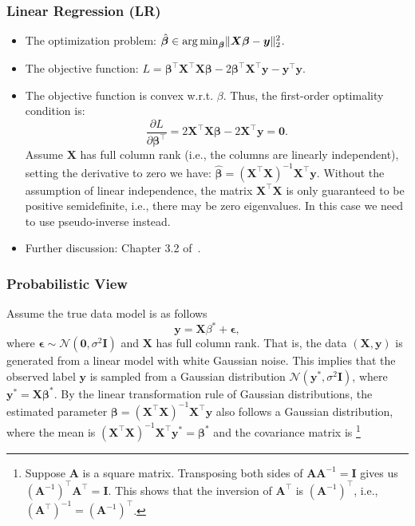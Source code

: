     \subsubsection{Linear Regression (LR)}\label{ML:linear-regression}
        \begin{itemize}
            \item The optimization problem: $\hat{\bm{\beta}} \in \operatorname{arg\,min}_{\bm{\beta}} \lVert\bm{X} \bm{\beta} - \bm{y}\rVert_2^2$.
            \item The objective function: $L = \bm{\beta}^\top \bm{X}^\top \bm{X} \bm{\beta} - 2 \bm{\beta}^\top \bm{X}^\top \bm{y} - \bm{y}^\top \bm{y}$.
            \item The objective function is convex w.r.t. $\beta$. Thus, the first-order optimality condition is: 
                \begin{equation}
                    \frac{\partial L}{\partial \bm{\beta}^\top} =  2 \bm{X}^\top \bm{X} \bm{\beta} - 2\bm{X}^\top \bm{y} = \bm{0}.
                \end{equation}
            Assume $\bm{X}$ has full column rank (i.e., the columns are linearly independent),  setting the derivative to zero we have: $\hat{\bm{\beta}} = (\bm{X}^\top \bm{X})^{-1} \bm{X}^\top \bm{y}$. Without the assumption of linear independence, the matrix $\bm{X}^\top \bm{X}$ is only guaranteed to be positive semidefinite, i.e., there may be zero eigenvalues. 
            In this case we need to use pseudo-inverse instead. 
            \item Further discussion: Chapter 3.2 of~\cite{hastie2009elements}.
        \end{itemize}

    \subsubsection{Probabilistic View}
        Assume the true data model is as follows
            \begin{equation}
                \bm{y} = \bm{X} \beta^\ast + \bm{\epsilon},
            \end{equation}
        where $\bm{\epsilon} \sim \mathcal{N}(\bm{0}, \sigma^2 \bm{I})$ and $\bm{X}$ has full column rank.
        That is, the data $(\bm{X}, \bm{y})$ is generated from a linear model with white Gaussian noise.
        This implies that the observed label $\bm{y}$ is sampled from a Gaussian distribution $\mathcal{N}(\bm{y}^\ast, \sigma^2 \bm{I})$, where $\bm{y}^\ast = \bm{X} \bm{\beta}^\ast$.
        By the linear transformation rule of Gaussian distributions, the estimated parameter $\bm{\beta} = (\bm{X}^\top \bm{X})^{-1} \bm{X}^\top \bm{y}$ also follows a Gaussian distribution, where the mean is $ (\bm{X}^\top \bm{X})^{-1} \bm{X}^\top \bm{y}^\ast = \bm{\beta}^\ast$ and the covariance matrix is        \footnote{Suppose $\bm{A}$ is a square matrix. Transposing both sides of $\bm{A} \bm{A}^{-1}=\bm{I}$ gives us ${(\bm{A}^{-1})}^\top \bm{A}^\top = \bm{I}$. This shows that the inversion of $\bm{A}^\top$ is $(\bm{A}^{-1})^\top$, i.e., $(\bm{A}^\top)^{-1} = (\bm{A}^{-1})^\top$. }
    
